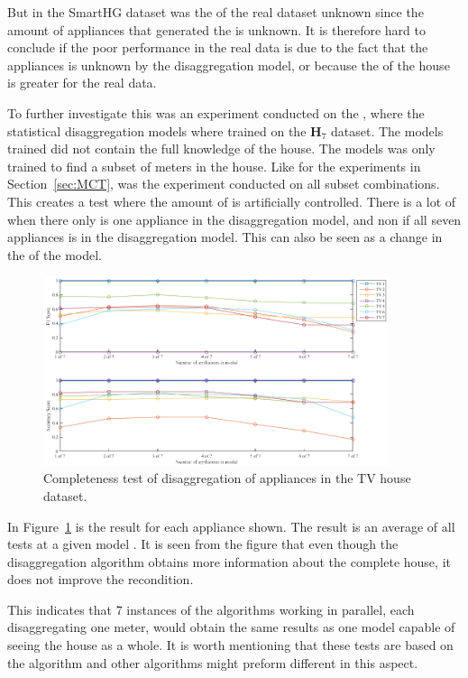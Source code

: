 But in the SmartHG dataset was the  of the real dataset unknown since the amount of appliances that generated the  is unknown. It is therefore hard to conclude if the poor performance in the real data is due to the fact that the appliances is unknown by the disaggregation model, or because the  of the house is greater for the real data. 

To further investigate this was an experiment conducted on the , where the statistical disaggregation models where trained on the $\textbf{H}_{7}$ dataset. The models trained did not contain the full knowledge of the house. The models was only trained to find a subset of meters in the house. Like for the experiments in Section~\ref{sec:MCT}, was the experiment conducted on all subset combinations. This creates a test where the amount of  is artificially controlled. There is a lot of  when there only is one appliance in the disaggregation model, and non if all seven appliances is in the disaggregation model. This can also be seen as a change in the  of the model. 

\begin{figure}[H]
\centering
\includegraphics[width=0.9\textwidth]{billeder/ModelCompletness.png}
\caption{Completeness test of disaggregation of appliances in the TV house dataset.}
\label{fig:COD}
\end{figure}

In Figure~\ref{fig:COD} is the result for each appliance shown. The result is an average of all tests at a given model . It is seen from the figure that even though the disaggregation algorithm obtains more information about the complete house, it does not improve the recondition. 

This indicates that 7 instances of the algorithms working in parallel, each disaggregating one meter, would obtain the same results as one model capable of seeing the house as a whole. It is worth mentioning that these tests are based on the  algorithm and other algorithms might preform different in this aspect. 

